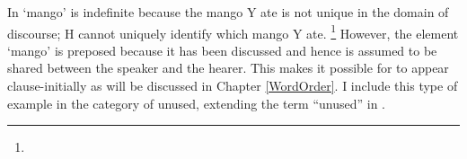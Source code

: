 In \Last `mango' is indefinite because the mango Y ate is not unique in the domain of discourse; H cannot uniquely identify which mango Y ate.%
 \footnote{
 }
However, the element  `mango' is preposed because it has been discussed and hence is assumed to be shared between the speaker and the hearer.
This makes it possible for  to appear clause-initially as will be discussed in Chapter \ref{WordOrder}.
%
I include this type of example in the category of unused,
extending the term ``unused'' in .

